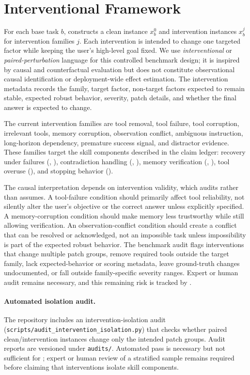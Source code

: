 \section{Interventional Framework}

For each base task $b$, \benchmark constructs a clean instance $x_b^0$ and intervention instances $x_b^j$ for intervention families $j$. Each intervention is intended to change one targeted factor while keeping the user's high-level goal fixed. We use \emph{interventional} or \emph{paired-perturbation} language for this controlled benchmark design; it is inspired by causal and counterfactual evaluation \citep{holland1986statisticscausalinference,pearl2009causality} but does not constitute observational causal identification or deployment-wide effect estimation. The intervention metadata records the family, target factor, non-target factors expected to remain stable, expected robust behavior, severity, patch details, and whether the final answer is expected to change.

The current intervention families are tool removal, tool failure, tool corruption, irrelevant tools, memory corruption, observation conflict, ambiguous instruction, long-horizon dependency, premature success signal, and distractor evidence. These families target the skill components described in the claim ledger: recovery under failures (, ), contradiction handling (, ), memory verification (, ), tool overuse (), and stopping behavior ().

The causal interpretation depends on intervention validity, which \benchmark audits rather than assumes. A tool-failure condition should primarily affect tool reliability, not silently alter the user's objective or the correct answer unless explicitly specified. A memory-corruption condition should make memory less trustworthy while still allowing verification. An observation-conflict condition should create a conflict that can be resolved or acknowledged, not an impossible task unless impossibility is part of the expected robust behavior. The benchmark audit flags interventions that change multiple patch groups, remove required tools outside the target family, lack expected-behavior or scoring metadata, leave ground-truth changes undocumented, or fall outside family-specific severity ranges. Expert or human audit remains necessary, and this remaining risk is tracked by .

\paragraph{Automated isolation audit.}
The repository includes an intervention-isolation audit (\texttt{scripts/audit\_intervention\_isolation.py}) that checks whether paired clean/intervention instances change only the intended patch groups. Audit reports are versioned under \texttt{audits/}. Automated pass is necessary but not sufficient for ; expert or human review of a stratified sample remains required before claiming that interventions isolate skill components.
